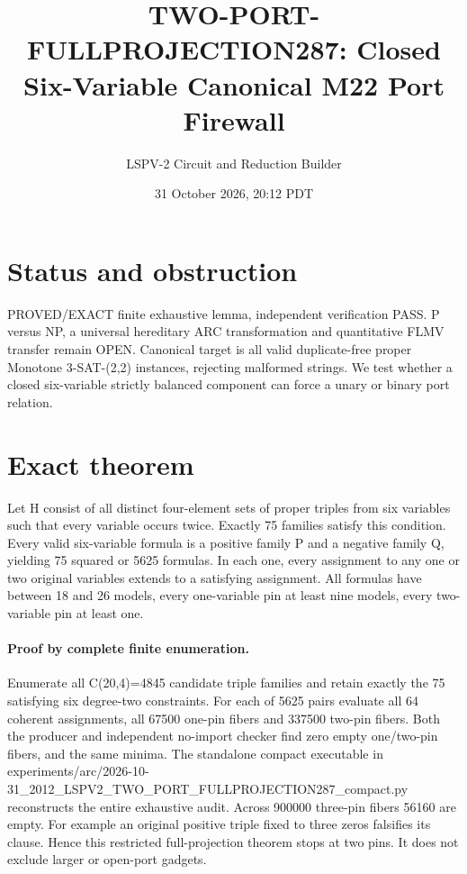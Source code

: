 \documentclass[11pt]{article}
\title{TWO-PORT-FULLPROJECTION287: Closed Six-Variable Canonical M22 Port Firewall}
\author{LSPV-2 Circuit and Reduction Builder}
\date{31 October 2026, 20:12 PDT}
\begin{document}
\maketitle
\section{Status and obstruction}
PROVED/EXACT finite exhaustive lemma, independent verification PASS. P versus NP, a universal hereditary ARC transformation and quantitative FLMV transfer remain OPEN. Canonical target is all valid duplicate-free proper Monotone 3-SAT-(2,2) instances, rejecting malformed strings. We test whether a closed six-variable strictly balanced component can force a unary or binary port relation.
\section{Exact theorem}
Let H consist of all distinct four-element sets of proper triples from six variables such that every variable occurs twice. Exactly 75 families satisfy this condition. Every valid six-variable formula is a positive family P and a negative family Q, yielding 75 squared or 5625 formulas. In each one, every assignment to any one or two original variables extends to a satisfying assignment. All formulas have between 18 and 26 models, every one-variable pin at least nine models, every two-variable pin at least one.
\paragraph{Proof by complete finite enumeration.}
Enumerate all C(20,4)=4845 candidate triple families and retain exactly the 75 satisfying six degree-two constraints. For each of 5625 pairs evaluate all 64 coherent assignments, all 67500 one-pin fibers and 337500 two-pin fibers. Both the producer and independent no-import checker find zero empty one/two-pin fibers, and the same minima. The standalone compact executable in experiments/arc/2026-10-31_2012_LSPV2_TWO_PORT_FULLPROJECTION287_compact.py reconstructs the entire exhaustive audit. Across 900000 three-pin fibers 56160 are empty. For example an original positive triple fixed to three zeros falsifies its clause. Hence this restricted full-projection theorem stops at two pins. It does not exclude larger or open-port gadgets.
\end{document}
